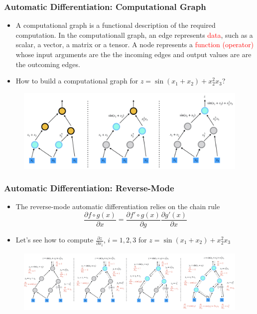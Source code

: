 \documentclass{beamer}
\begin{document}
\begin{frame}
	\frametitle{Automatic Differentiation: Computational Graph}
	
	\begin{itemize}
		\item A computational graph is a functional description of the required computation. In the computationall graph, an edge represents \textcolor{red}{data}, such as a scalar, a vector, a matrix or a tensor. A node represents a \textcolor{red}{function (operator)} whose input arguments are the the incoming edges and output values are are the outcoming edges. 
		\item How to build a computational graph for $z = \sin(x_1+x_2) + x_2^2 x_3$?
	\end{itemize}
	
	\begin{figure}[hbt]
  \includegraphics[width=1.0\textwidth]{../fd}
\end{figure}
\end{frame}

\begin{frame}
	\frametitle{Automatic Differentiation: Reverse-Mode}
	
	\begin{itemize}
		\item The reverse-mode automatic differentiation relies on the chain rule 
		$$\frac{\partial f\circ g (x)}{\partial x} = \frac{\partial f'\circ g(x)}{\partial g} \frac{\partial g'(x)}{\partial x}$$
		\item Let's see how to compute $\frac{\partial z}{\partial x_i}$, $i=1,2,3$ for $z = \sin(x_1+x_2) + x_2^2 x_3$
	\end{itemize}
	\centering
	\begin{figure}[hbt]
  \includegraphics[width=1.0\textwidth]{../bd}
\end{figure}

\end{frame}
\end{document}
